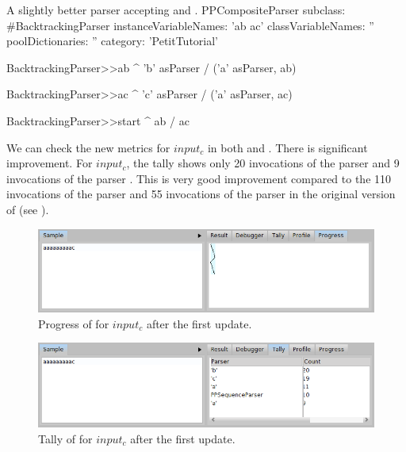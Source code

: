 \documentclass[a4paper,10pt,twoside]{book}
\begin{document}
\begin{script}{A slightly better parser accepting  and . \label{scr:pp/backtrackingParser-update-1}}
PPCompositeParser subclass: #BacktrackingParser
	instanceVariableNames: 'ab ac'
	classVariableNames: ''
	poolDictionaries: ''
	category: 'PetitTutorial'

BacktrackingParser>>ab
  ^  'b' asParser / 
     ('a' asParser, ab)

BacktrackingParser>>ac
  ^  'c' asParser / 
     ('a' asParser, ac)

BacktrackingParser>>start
  ^ ab / ac
\end{script}

We can check the new metrics for $input_c$ in both  and . There is significant improvement.
For $input_c$, the tally shows only 20 invocations of the parser  and 9 invocations of the parser .
This is very good improvement compared to the 110 invocations of the parser  and 55 invocations of the parser  in the original version of  (see ).

\begin{figure}
  \begin{center}
    \includegraphics[width=\linewidth]{example-progressAaac-update-1}
    \caption{Progress of  for $input_c$ after the first update. \label{fig:pp/example-progressAaac-update-1}}
  \end{center}
\end{figure}

\begin{figure}
  \begin{center}
    \includegraphics[width=\linewidth]{example-tallyAaac-update-1}
    \caption{Tally of  for $input_c$ after the first update. \label{fig:pp/example-tallyAaac-update-1}}
  \end{center}
\end{figure}
\end{document}
